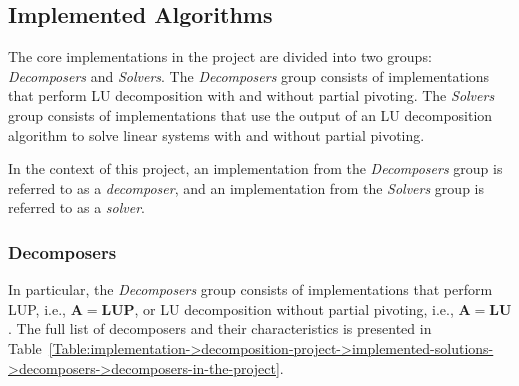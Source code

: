 \subsection{Implemented Algorithms}\label{Subsection:implementation->decomposition-project->implemented-algorithms}
The core implementations in the project are divided into two groups: \textit{Decomposers} and \textit{Solvers}.
The \textit{Decomposers} group consists of implementations that perform LU decomposition with and without partial pivoting.
The \textit{Solvers} group consists of implementations that use the output of an LU decomposition algorithm to solve linear systems with and without partial pivoting.

In the context of this project, an implementation from the \textit{Decomposers} group is referred to as a \textit{decomposer}, and an implementation from the \textit{Solvers} group is referred to as a \textit{solver}.

\subsubsection{Decomposers}\label{Subsection:implementation->decomposition-project->implemented-solutions->decomposers}
In particular, the \textit{Decomposers} group consists of implementations that perform LUP, i.e., $\mathbf{A} = \mathbf{LUP}$, or LU decomposition without partial pivoting, i.e., $\mathbf{A} = \mathbf{LU}$.
The full list of decomposers and their characteristics is presented in Table~\ref{Table:implementation->decomposition-project->implemented-solutions->decomposers->decomposers-in-the-project}.

